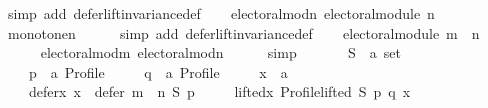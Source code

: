 \begin{isabellebody}
\ {\isacharparenleft}{\kern0pt}simp\ add{\isacharcolon}{\kern0pt}\ defer{\isacharunderscore}{\kern0pt}lift{\isacharunderscore}{\kern0pt}invariance{\isacharunderscore}{\kern0pt}def{\isacharparenright}{\kern0pt}\isanewline
\ \ \isamarkupfalse%
\ electoral{\isacharunderscore}{\kern0pt}mod{\isacharunderscore}{\kern0pt}n{\isacharcolon}{\kern0pt}\ {\isachardoublequoteopen}electoral{\isacharunderscore}{\kern0pt}module\ n{\isachardoublequoteclose}\isanewline
\ \ \ \ \isamarkupfalse%
\ monotone{\isacharunderscore}{\kern0pt}n\isanewline
\ \ \ \ \isamarkupfalse%
\ {\isacharparenleft}{\kern0pt}simp\ add{\isacharcolon}{\kern0pt}\ defer{\isacharunderscore}{\kern0pt}lift{\isacharunderscore}{\kern0pt}invariance{\isacharunderscore}{\kern0pt}def{\isacharparenright}{\kern0pt}\isanewline
\ \ \isamarkupfalse%
\ {\isachardoublequoteopen}electoral{\isacharunderscore}{\kern0pt}module\ {\isacharparenleft}{\kern0pt}m\ {\isasymparallel}\isactrlsub {\isasymup}\ n{\isacharparenright}{\kern0pt}{\isachardoublequoteclose}\isanewline
\ \ \ \ \isamarkupfalse%
\ electoral{\isacharunderscore}{\kern0pt}mod{\isacharunderscore}{\kern0pt}m\ electoral{\isacharunderscore}{\kern0pt}mod{\isacharunderscore}{\kern0pt}n\isanewline
\ \ \ \ \isamarkupfalse%
\ simp\isanewline
{}\isamarkupfalse%
\isanewline
\ \ \isamarkupfalse%
\isanewline
\ \ \ \ S\ {\isacharcolon}{\kern0pt}{\isacharcolon}{\kern0pt}\ {\isachardoublequoteopen}{\isacharprime}{\kern0pt}a\ set{\isachardoublequoteclose}\ \isanewline
\ \ \ \ p\ {\isacharcolon}{\kern0pt}{\isacharcolon}{\kern0pt}\ {\isachardoublequoteopen}{\isacharprime}{\kern0pt}a\ Profile{\isachardoublequoteclose}\ \isanewline
\ \ \ \ q\ {\isacharcolon}{\kern0pt}{\isacharcolon}{\kern0pt}\ {\isachardoublequoteopen}{\isacharprime}{\kern0pt}a\ Profile{\isachardoublequoteclose}\ \isanewline
\ \ \ \ x\ {\isacharcolon}{\kern0pt}{\isacharcolon}{\kern0pt}\ {\isachardoublequoteopen}{\isacharprime}{\kern0pt}a{\isachardoublequoteclose}\isanewline
\ \ \isamarkupfalse%
\isanewline
\ \ \ \ defer{\isacharunderscore}{\kern0pt}x{\isacharcolon}{\kern0pt}\ {\isachardoublequoteopen}x\ {\isasymin}\ defer\ {\isacharparenleft}{\kern0pt}m\ {\isasymparallel}\isactrlsub {\isasymup}\ n{\isacharparenright}{\kern0pt}\ S\ p{\isachardoublequoteclose}\ \isanewline
\ \ \ \ lifted{\isacharunderscore}{\kern0pt}x{\isacharcolon}{\kern0pt}\ {\isachardoublequoteopen}Profile{\isachardot}{\kern0pt}lifted\ S\ p\ q\ x{\isachardoublequoteclose}\isanewline

\end{isabellebody}
